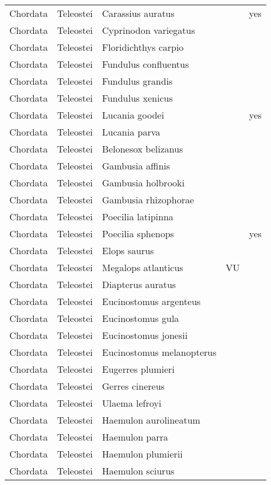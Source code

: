 \begin{longtable}{lllll}
  Chordata & Teleostei & Carassius auratus &  & yes \\ 
  Chordata & Teleostei & Cyprinodon variegatus &  &  \\ 
  Chordata & Teleostei & Floridichthys carpio &  &  \\ 
  Chordata & Teleostei & Fundulus confluentus &  &  \\ 
  Chordata & Teleostei & Fundulus grandis &  &  \\ 
  Chordata & Teleostei & Fundulus xenicus &  &  \\ 
  Chordata & Teleostei & Lucania goodei &  & yes \\ 
  Chordata & Teleostei & Lucania parva &  &  \\ 
  Chordata & Teleostei & Belonesox belizanus &  &  \\ 
  Chordata & Teleostei & Gambusia affinis &  &  \\ 
  Chordata & Teleostei & Gambusia holbrooki &  &  \\ 
  Chordata & Teleostei & Gambusia rhizophorae &  &  \\ 
  Chordata & Teleostei & Poecilia latipinna &  &  \\ 
  Chordata & Teleostei & Poecilia sphenops &  & yes \\ 
  Chordata & Teleostei & Elops saurus &  &  \\ 
  Chordata & Teleostei & Megalops atlanticus & VU &  \\ 
  Chordata & Teleostei & Diapterus auratus &  &  \\ 
  Chordata & Teleostei & Eucinostomus argenteus &  &  \\ 
  Chordata & Teleostei & Eucinostomus gula &  &  \\ 
  Chordata & Teleostei & Eucinostomus jonesii &  &  \\ 
  Chordata & Teleostei & Eucinostomus melanopterus &  &  \\ 
  Chordata & Teleostei & Eugerres plumieri &  &  \\ 
  Chordata & Teleostei & Gerres cinereus &  &  \\ 
  Chordata & Teleostei & Ulaema lefroyi &  &  \\ 
  Chordata & Teleostei & Haemulon aurolineatum &  &  \\ 
  Chordata & Teleostei & Haemulon parra &  &  \\ 
  Chordata & Teleostei & Haemulon plumierii &  &  \\ 
  Chordata & Teleostei & Haemulon sciurus &  &  \\ 

\end{longtable}
